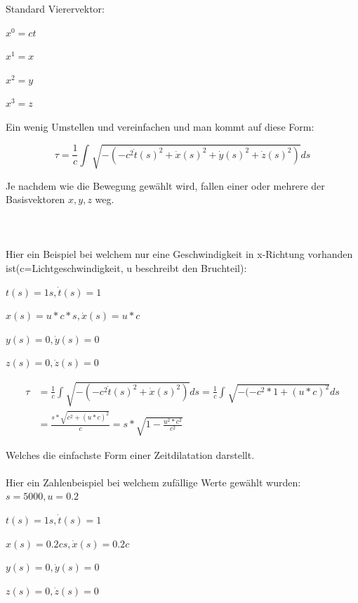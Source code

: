 \documentclass[]{article}
\begin{document}
	Standard Vierervektor:
	 
	\begin{list}{}{}
		\item \(x^{0}=ct\)
		\item \(x^{1}=x\)
		\item \(x^{2}=y\)
		\item \(x^{3}=z\)
	\end{list}

	 Ein wenig Umstellen und vereinfachen und man kommt auf diese Form:
	 
	 \begin{equation}
	 	\tau
	 	=
	 	\frac{1}{c}\int_{}^{}\sqrt{-(-c^2\dot{t}(s)^{2}+\dot{x}(s)^{2}+\dot{y}(s)^{2}+\dot{z}(s)^{2})}ds
	 \end{equation}
	 
	 Je nachdem wie die Bewegung gew\"ahlt wird, fallen einer oder mehrere der Basisvektoren  $x, y, z$ weg.\\\\\\\\ Hier ein Beispiel bei welchem nur eine Geschwindigkeit in x-Richtung vorhanden ist(c=Lichtgeschwindigkeit, u beschreibt den Bruchteil):
	 
	 \begin{list}{}{}
	 	\item $t(s)=1s, \dot{t}(s)=1$
	 	\item $x(s)=u*c*s, \dot{x}(s)=u*c$
	 	\item $y(s)=0, \dot{y}(s)=0$
	 	\item $z(s)=0, \dot{z}(s)=0$
	 \end{list}
	 
	 \begin{align*}
	 	\tau
	 	&=
	 	\frac{1}{c}\int_{}^{}\sqrt{-(-c^2\dot{t}(s)^2+\dot{x}(s)^2)}ds 
	 	=
	 	\frac{1}{c}\int_{}^{}\sqrt{-(-c^2*1+(u*c)^{2}}ds\\
	 	&=
	 	\frac{s*\sqrt{c^2+(u*c)^{2}}}{c} 
	 	=
	 	s*\sqrt{1-\frac{u^2*c^2}{c^2}}
	 \end{align*}
	 
	 Welches die einfachste Form einer Zeitdilatation darstellt.\\
	 \\
	 Hier ein Zahlenbeispiel bei welchem zuf\"allige Werte gew\"ahlt wurden:
	 $s=5000, u=0.2$ 
	 
	 \begin{list}{}{}
	 	\item $t(s)=1s, \dot{t}(s)=1$
	 	\item $x(s)=0.2cs, \dot{x}(s)=0.2c$
		\item $y(s)=0, \dot{y}(s)=0$
		\item $z(s)=0, \dot{z}(s)=0$
	 \end{list}
	 
\end{document}
